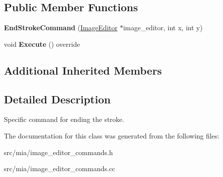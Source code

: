 \subsection*{Public Member Functions}
\begin{DoxyCompactItemize}
\item 
\mbox{\label{classimage__tools_1_1EndStrokeCommand_ab70066942dc6862754fd7530330f6325}} 
{\bfseries End\+Stroke\+Command} (\hyperlink{classimage__tools_1_1ImageEditor}{Image\+Editor} $\ast$image\+\_\+editor, int x, int y)
\item 
\mbox{\label{classimage__tools_1_1EndStrokeCommand_a2bc57e28b0060b88b38cc6fb84b9711f}} 
void {\bfseries Execute} () override
\end{DoxyCompactItemize}
\subsection*{Additional Inherited Members}


\subsection{Detailed Description}
Specific command for ending the stroke. 

The documentation for this class was generated from the following files\+:\begin{DoxyCompactItemize}
\item 
src/mia/image\+\_\+editor\+\_\+commands.\+h\item 
src/mia/image\+\_\+editor\+\_\+commands.\+cc\end{DoxyCompactItemize}
